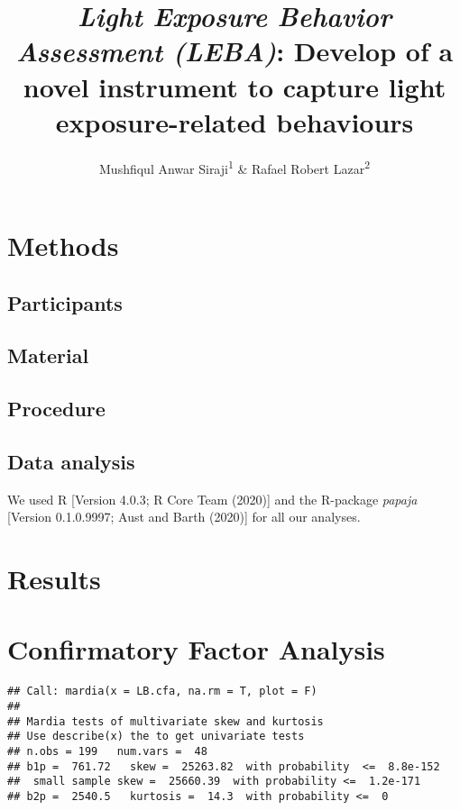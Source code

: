 \documentclass[
  english,
  man]{apa6}
\title{\emph{Light Exposure Behavior Assessment (LEBA)}: Develop of a novel instrument to capture light exposure-related behaviours}
\author{Mushfiqul Anwar Siraji\textsuperscript{1} \& Rafael Robert Lazar\textsuperscript{2}}
\date{}
\affiliation{\vspace{0.5cm}\textsuperscript{1} Wilhelm-Wundt-University\\\textsuperscript{2} Konstanz Business School}
\begin{document}
\maketitle

\hypertarget{methods}{%
\section{Methods}\label{methods}}

\hypertarget{participants}{%
\subsection{Participants}\label{participants}}

\hypertarget{material}{%
\subsection{Material}\label{material}}

\hypertarget{procedure}{%
\subsection{Procedure}\label{procedure}}

\hypertarget{data-analysis}{%
\subsection{Data analysis}\label{data-analysis}}

We used R {[}Version 4.0.3; R Core Team (2020){]} and the R-package \emph{papaja} {[}Version 0.1.0.9997; Aust and Barth (2020){]} for all our analyses.

\hypertarget{results}{%
\section{Results}\label{results}}

\hypertarget{confirmatory-factor-analysis}{%
\section{Confirmatory Factor Analysis}\label{confirmatory-factor-analysis}}

\begin{verbatim}
## Call: mardia(x = LB.cfa, na.rm = T, plot = F)
## 
## Mardia tests of multivariate skew and kurtosis
## Use describe(x) the to get univariate tests
## n.obs = 199   num.vars =  48 
## b1p =  761.72   skew =  25263.82  with probability  <=  8.8e-152
##  small sample skew =  25660.39  with probability <=  1.2e-171
## b2p =  2540.5   kurtosis =  14.3  with probability <=  0
\end{verbatim}
\end{document}
